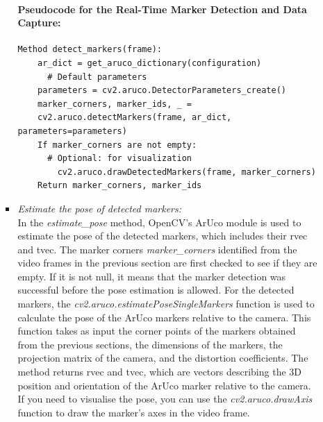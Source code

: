 \documentclass[12pt]{article}
\begin{document}
\begin{enumerate}
\begin{enumerate}
\begin{itemize}
                                    \paragraph{Pseudocode for the Real-Time Marker Detection and Data Capture:}
                                    \begin{verbatim}
Method detect_markers(frame):
    ar_dict = get_aruco_dictionary(configuration)
      # Default parameters
    parameters = cv2.aruco.DetectorParameters_create() 
    marker_corners, marker_ids, _ = 
    cv2.aruco.detectMarkers(frame, ar_dict, parameters=parameters)
    If marker_corners are not empty:
      # Optional: for visualization
        cv2.aruco.drawDetectedMarkers(frame, marker_corners)  
    Return marker_corners, marker_ids
                              \end{verbatim}
                              \item \textit{Estimate the pose of detected markers:}
                                    \\
                                    In the \emph{estimate\_pose } method, OpenCV's ArUco module is used to estimate the pose of the detected markers, which includes their \gls{rvec} and \gls{tvec}. The marker corners \emph{marker\_corners } identified from the video frames in the previous section are first checked to see if they are empty. If it is not null, it means that the marker detection was successful before the pose estimation is allowed. For the detected markers, the \emph{cv2.aruco.estimatePoseSingleMarkers} function is used to calculate the pose of the ArUco markers relative to the camera. This function takes as input the corner points of the markers obtained from the previous sections, the dimensions of the markers, the projection matrix of the camera, and the distortion coefficients. The method returns \gls{rvec} and \gls{tvec}, which are vectors describing the 3D position and orientation of the ArUco marker relative to the camera. If you need to visualise the pose, you can use the \emph{cv2.aruco.drawAxis} function to draw the marker's axes in the video frame.

\end{itemize}
\end{enumerate}
\end{enumerate}
\end{document}
